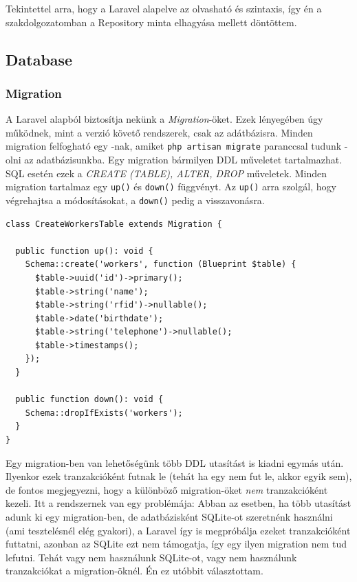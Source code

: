 \documentclass[a4paper,12pt]{thesis-ekf}
\theoremstyle{definition}
\begin{document}
				 Tekintettel arra, hogy a Laravel alapelve az olvasható és  szintaxis, így én a szakdolgozatomban a Repository minta elhagyása mellett döntöttem.
			
			\subsection{Database}
				\subsubsection{Migration}
					A Laravel alapból biztosítja nekünk a \emph{Migration}-öket. Ezek lényegében úgy működnek, mint a verzió követő rendszerek, csak az adátbázisra. Minden migration felfogható egy \emph{}-nak, amiket \texttt{php artisan migrate} paranccsal tudunk \emph{}-olni az adatbázisunkba. Egy migration bármilyen DDL műveletet tartalmazhat. SQL esetén ezek a \emph{CREATE (TABLE), ALTER, DROP} műveletek. Minden migration tartalmaz egy \texttt{up()} és \texttt{down()} függvényt. Az \texttt{up()} arra szolgál, hogy végrehajtsa a módosításokat, a \texttt{down()} pedig a visszavonásra.\cite{migration-docs}
					
					\begin{lstlisting}[caption={P\'elda migration (create\_workers\_table.php)},captionpos=b]
class CreateWorkersTable extends Migration {

  public function up(): void {
    Schema::create('workers', function (Blueprint $table) {
      $table->uuid('id')->primary();
      $table->string('name');
      $table->string('rfid')->nullable();
      $table->date('birthdate');
      $table->string('telephone')->nullable();
      $table->timestamps();
    });
  }

  public function down(): void {
    Schema::dropIfExists('workers');
  }
}
					\end{lstlisting}
					Egy migration-ben van lehetőségünk több DDL utasítást is kiadni egymás után. Ilyenkor ezek tranzakcióként futnak le (tehát ha egy nem fut le, akkor egyik sem), de fontos megjegyezni, hogy a különböző migration-öket \emph{nem} tranzakcióként kezeli. Itt a rendszernek van egy problémája: Abban az esetben, ha több utasítást adunk ki egy migration-ben, de adatbázisként SQLite-ot szeretnénk használni (ami tesztelésnél elég gyakori), a Laravel így is megpróbálja ezeket tranzakcióként futtatni, azonban az SQLite ezt nem támogatja, így egy ilyen migration nem tud lefutni. Tehát vagy nem használunk SQLite-ot, vagy nem használunk tranzakciókat a migration-öknél. Én ez utóbbit választottam.\cite{migration-sqlite}
					
\end{document}
